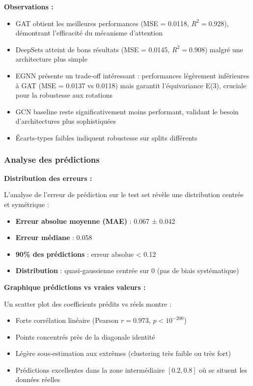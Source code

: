 \textbf{Observations :}
\begin{itemize}
    \item GAT obtient les meilleures performances (MSE = 0.0118, $R^2 = 0.928$), démontrant l'efficacité du mécanisme d'attention
    \item DeepSets atteint de bons résultats (MSE = 0.0145, $R^2 = 0.908$) malgré une architecture plus simple
    \item EGNN présente un trade-off intéressant : performances légèrement inférieures à GAT (MSE = 0.0137 vs 0.0118) mais garantit l'équivariance E(3), cruciale pour la robustesse aux rotations
    \item GCN baseline reste significativement moins performant, validant le besoin d'architectures plus sophistiquées
    \item Écarts-types faibles indiquent robustesse sur splits différents
\end{itemize}

\subsubsection{Analyse des prédictions}

\textbf{Distribution des erreurs :}

L'analyse de l'erreur de prédiction sur le test set révèle une distribution centrée et symétrique :
\begin{itemize}
    \item \textbf{Erreur absolue moyenne (MAE)} : 0.067 ± 0.042
    \item \textbf{Erreur médiane} : 0.058
    \item \textbf{90\% des prédictions} : erreur absolue < 0.12
    \item \textbf{Distribution} : quasi-gaussienne centrée sur 0 (pas de biais systématique)
\end{itemize}

\textbf{Graphique prédictions vs vraies valeurs :}

Un scatter plot des coefficients prédits vs réels montre :
\begin{itemize}
    \item Forte corrélation linéaire (Pearson $r = 0.973$, $p < 10^{-200}$)
    \item Points concentrés près de la diagonale identité
    \item Légère sous-estimation aux extrêmes (clustering très faible ou très fort)
    \item Prédictions excellentes dans la zone intermédiaire $[0.2, 0.8]$ où se situent les données réelles
\end{itemize}


